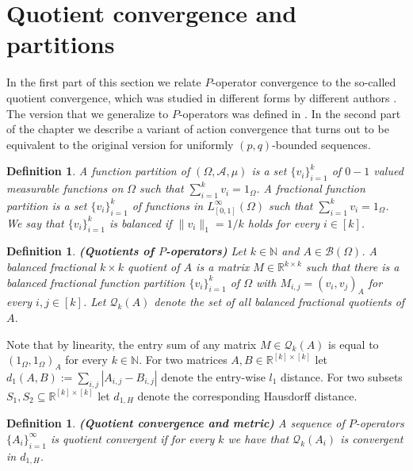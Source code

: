 \documentclass[a4wider]{amsart}
\newtheorem{definition}[theorem]{Definition}
\theoremstyle{definitionbreak}\newtheorem{D}[theorem]{Definition}
\theoremstyle{definitionbreak}\newtheorem*{D*}{Definition}
\begin{document}
\section{Quotient convergence and partitions}

In the first part of this section we relate $P$-operator convergence to the so-called quotient convergence, which  was studied  in different forms by different authors \cite{BCCZ2, BR, kunszenti2}. The version that we generalize to $P$-operators was defined in \cite{kunszenti2}. In the second part of the chapter we describe a variant of action convergence that turns out to be equivalent to the original version for uniformly $(p,q)$-bounded sequences. 

\begin{definition} A function partition of $(\Omega,\mathcal{A},\mu)$ is a set $\{v_i\}_{i=1}^k$ of $0-1$ valued measurable functions on $\Omega$ such that $\sum_{i=1}^k v_i=1_\Omega$. 
A fractional function partition is a set $\{v_i\}_{i=1}^k$ of functions in $L^\infty_{[0,1]}(\Omega)$ such that $\sum_{i=1}^k v_i=1_\Omega$. We say that $\{v_i\}_{i=1}^k$ is balanced if $\|v_i\|_1=1/k$ holds for every $i\in [k]$.
\end{definition}

\begin{definition} {\bf (Quotients of $P$-operators)} Let $k\in\mathbb{N}$ and $A\in\mathcal{B}(\Omega)$. A balanced fractional $k\times k$ quotient of $A$ is a matrix $M\in\mathbb{R}^{k\times k}$ such that there is a balanced fractional function partition $\{v_i\}_{i=1}^k$ of $\Omega$ with $M_{i,j}=(v_i,v_j)_A$ for every $i,j\in [k]$. Let $\mathcal{Q}_{k}(A)$ denote the set of all balanced fractional quotients of $A$.
\end{definition}

Note that by linearity, the entry sum of any matrix $M\in\mathcal{Q}_k(A)$ is equal to $(1_\Omega,1_\Omega)_A$ for every $k\in\mathbb{N}$.
For two matrices $A,B\in \mathbb{R}^{[k]\times [k]}$ let $d_1(A,B):=\sum_{i,j}|A_{i,j}-B_{i,j}|$ denote the entry-wise $l_1$ distance. For two subsets $S_1,S_2\subseteq \mathbb{R}^{[k]\times [k]}$ let $d_{1,H}$ denote the corresponding Hausdorff distance. 

\begin{definition} {\bf (Quotient convergence and metric)} A sequence of $P$-operators $\{A_i\}_{i=1}^\infty$ is quotient convergent if for every $k$ we have that $\mathcal{Q}_k(A_i)$ is convergent in $d_{1,H}$. 
\end{definition}
\end{document}
